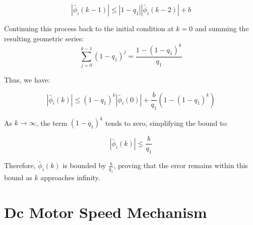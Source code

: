 \documentclass[journal,onecolumn]{IEEEtran}
\begin{document}
\begin{equation}
\label{model 28}
|\tilde{\phi_i}(k-1)| \leq |1 - q_1| |\tilde{\phi_i}(k-2)| + b
\end{equation}

Continuing this process back to the initial condition at \(k=0\) and summing the resulting geometric series:
\[
\sum_{j=0}^{k-1} (1-q_1)^j = \frac{1-(1-q_1)^k}{q_1}
\]

Thus, we have:

\begin{equation}
\label{model 29}
|\tilde{\phi_i}(k)| \leq (1 - q_1)^k |\tilde{\phi_i}(0)| + \frac{b}{q_1} (1 - (1 - q_1)^k)
\end{equation}

As \(k \rightarrow \infty\), the term \((1-q_1)^k\) tends to zero, simplifying the bound to:

\begin{equation}
\label{model 30}
|\tilde{\phi_i}(k)| \leq \frac{b}{q_1}
\end{equation}

Therefore, \(\tilde{\phi_i}(k)\) is bounded by \(\frac{b}{q_1}\), proving that the error remains within this bound as \(k\) approaches infinity.











\section{Dc Motor Speed Mechanism}
\end{document}
